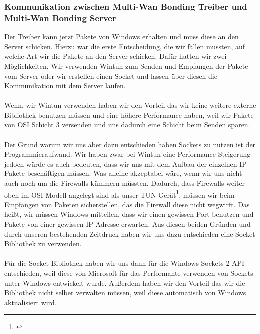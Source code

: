 \subsubsection{Kommunikation zwischen Multi-Wan Bonding Treiber und Multi-Wan Bonding Server}
Der Treiber kann jetzt Pakete von Windows erhalten und muss diese an den Server schicken. Hierzu war die erste Entscheidung, die wir fällen mussten, auf welche Art wir die Pakete an den Server schicken. Dafür hatten wir zwei Möglichkeiten. Wir verwenden Wintun zum Senden und Empfangen der Pakete vom Server oder wir erstellen einen Socket und lassen über diesen die Kommunikation mit dem Server laufen.
\\\\
Wenn, wir Wintun verwenden haben wir den Vorteil das wir keine weitere externe Bibliothek benutzen müssen und eine höhere Performance haben, weil wir Pakete von OSI Schicht 3 versenden und uns dadurch eine Schicht beim Senden sparen.
\\\\
Der Grund warum wir uns aber dazu entschieden haben Sockets zu nutzen ist der Programmieraufwand. Wir haben zwar bei Wintun eine Performance Steigerung jedoch würde es auch bedeuten, dass wir uns mit dem Aufbau der einzelnen IP Pakete beschäftigen müssen. Was alleine akzeptabel wäre, wenn wir uns nicht auch noch um die Firewalls kümmern müssten. Dadurch, dass Firewalls weiter oben im OSI Modell angelegt sind als unser TUN Gerät\footnote[1]{\cite[Vgl.][]{8}}, müssen wir beim Empfangen von Paketen sicherstellen, das die Firewall diese nicht wegwirft. Das heißt, wir müssen Windows mitteilen, dass wir einen gewissen Port benutzen und Pakete von einer gewissen IP-Adresse erwarten. Aus diesen beiden Gründen und durch unseren bestehenden Zeitdruck haben wir uns dazu entschieden eine Socket Bibliothek zu verwenden.
\\\\
Für die Socket Bibliothek haben wir uns dann für die Windows Sockets 2 API entschieden, weil diese von Microsoft für das Performante verwenden von Sockets unter Windows entwickelt wurde. Außerdem haben wir den Vorteil das wir die Bibliothek nicht selber verwalten müssen, weil diese automatisch von Windows aktualisiert wird.


